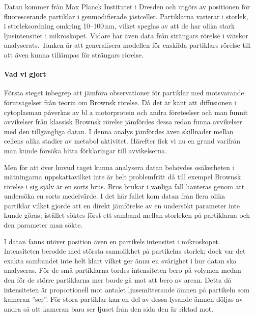 Datan kommer från Max Planck Institutet i Dresden och utgörs av positionen för fluorescerande partiklar i genmodifierade jästceller. Partiklarna varierar i storlek, i storleksordning omkring 10--100\,nm, vilket speglas av att de har olika stark ljusintensitet i mikroskopet. 
Vidare har även data från strängars rörelse i vätskor analyserats. Tanken är att generalisera modellen för enskilda partiklars rörelse till att även kunna tillämpas för strängars rörelse.


\paragraph{Vad vi gjort}
Första steget inbegrep att jämföra observationer för partiklar med motsvarande förutsägelser från teorin om Brownsk rörelse. Då det är känt att diffusionen i cytoplasman påverkas av bl a motorprotein och andra företeelser och man funnit avvikelser\cite{Gou_etal2014} från klassisk Brownsk rörelse jämfördes dessa redan funna avvikelser med den tillgängliga datan. I denna analys jämfördes även skillnader mellan cellens olika stadier av metabol aktivitet. 
Härefter fick vi nu en grund varifrån man kunde försöka hitta förklaringar till avvikelserna.

Men för att över huvud taget kunna analysera datan behövdes osäkerheten i mätningarna uppskattavilket inte är helt problemfritt då till exempel Brownsk rörelse i sig själv är en sorts brus. Brus brukar i vanliga fall hanteras genom att undersöka en sorts medelvärde. I det här fallet kom datan från flera olika partiklar vilket gjorde att en direkt jämförelse av en undersökt parameter inte kunde göras; istället söktes först ett samband mellan storleken på partiklarna och den parameter man sökte.

I datan fanns utöver position även en partikels intensitet i mikroskopet. Intensiteten berodde med största sannolikhet på partikelns storlek; dock var det exakta sambandet inte helt klart vilket ger ännu en svårighet i hur datan ska analyseras. För de små partiklarna tordes intensiteten bero på volymen medan den för de större partiklarna mer borde gå mot att bero av arean. Detta då intensiteten är proportionell mot antalet ljusemitterande ämnen på partikeln som kameran ''ser''. För stora partiklar kan en del av dessa lysande ämnen döljas av andra så att kameran bara ser ljuset från den sida den är riktad mot. 


